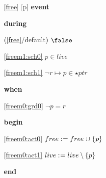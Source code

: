 \noindent \ref{free} [p] \textbf{event}
\begin{block}
  \item   \textbf{during}
  \begin{block}
  \item[ (\ref{free}/default) ]\sout{$\false $} %
  \end{block}
  \begin{block}
  \item[ \eqref{freem1:sch0} ]{$p \in live$} %
  \item[ \eqref{freem1:sch1} ]{$\neg r \mapsto p \in \star ptr$} %
  \end{block}
  \item   \textbf{when}
  \begin{block}
  \item[ \eqref{freem0:grd0} ]{$\neg p = r $} %
  \end{block}
  \item   \textbf{begin}
  \begin{block}
  \item[ \eqref{freem0:act0} ]{$free \mathrel{:\mkern1mu=} free \mathbin{\mkern1mu\cup\mkern1mu} \{ p \} $} %
  \item[ \eqref{freem0:act1} ]{$live \mathrel{:\mkern1mu=} live \setminus \{ p \} $} %
  \end{block}
  \item   \textbf{end} \\
\end{block}
